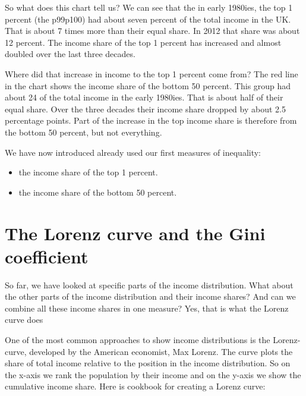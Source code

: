 \documentclass[]{book}
\providecommand{\tightlist}{%
  \setlength{\itemsep}{0pt}\setlength{\parskip}{0pt}}
\begin{document}
So what does this chart tell us? We can see that the in early 1980ies, the top 1 percent (the p99p100) had about seven percent of the total income in the UK. That is about 7 times more than their equal share. In 2012 that share was about 12 percent. The income share of the top 1 percent has increased and almost doubled over the last three decades.

Where did that increase in income to the top 1 percent come from? The red line in the chart shows the income share of the bottom 50 percent. This group had about 24 of the total income in the early 1980ies. That is about half of their equal share. Over the three decades their income share dropped by about 2.5 percentage points. Part of the increase in the top income share is therefore from the bottom 50 percent, but not everything.

We have now introduced already used our first measures of inequality:

\begin{itemize}
\tightlist
\item
  the income share of the top 1 percent.
\item
  the income share of the bottom 50 percent.
\end{itemize}

\hypertarget{the-lorenz-curve-and-the-gini-coefficient}{%
\section{The Lorenz curve and the Gini coefficient}\label{the-lorenz-curve-and-the-gini-coefficient}}

So far, we have looked at specific parts of the income distribution. What about the other parts of the income distribution and their income shares? And can we combine all these income shares in one measure? Yes, that is what the Lorenz curve does

One of the most common approaches to show income distributions is the Lorenz-curve, developed by the American economist, Max Lorenz. The curve plots the share of total income relative to the position in the income distribution. So on the x-axis we rank the population by their income and on the y-axis we show the cumulative income share. Here is cookbook for creating a Lorenz curve:
\end{document}

